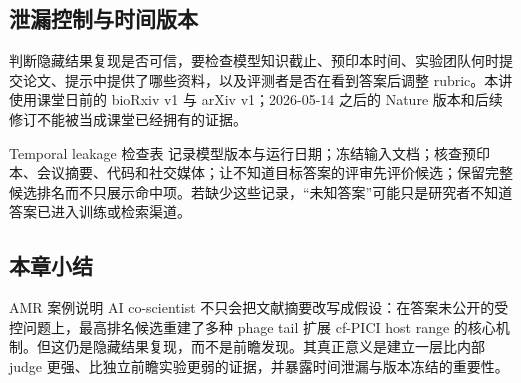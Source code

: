 \subsection{泄漏控制与时间版本}

判断隐藏结果复现是否可信，要检查模型知识截止、预印本时间、实验团队何时提交论文、提示中提供了哪些资料，以及评测者是否在看到答案后调整 rubric。本讲使用课堂日前的 bioRxiv v1 与 arXiv v1；2026-05-14 之后的 Nature 版本和后续修订不能被当成课堂已经拥有的证据。

\begin{warningbox}{Temporal leakage 检查表}
记录模型版本与运行日期；冻结输入文档；核查预印本、会议摘要、代码和社交媒体；让不知道目标答案的评审先评价候选；保留完整候选排名而不只展示命中项。若缺少这些记录，“未知答案”可能只是研究者不知道答案已进入训练或检索渠道。
\end{warningbox}

\subsection{本章小结}

AMR 案例说明 AI co-scientist 不只会把文献摘要改写成假设：在答案未公开的受控问题上，最高排名候选重建了多种 phage tail 扩展 cf-PICI host range 的核心机制。但这仍是隐藏结果复现，而不是前瞻发现。其真正意义是建立一层比内部 judge 更强、比独立前瞻实验更弱的证据，并暴露时间泄漏与版本冻结的重要性。

